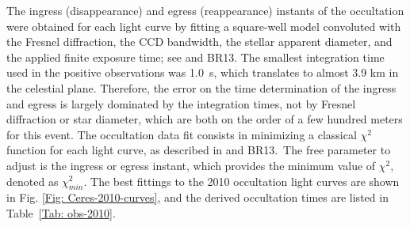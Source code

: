\documentclass[useAMS,usenatbib]{mn2e}
\begin{document}
The ingress (disappearance) and egress (reappearance) instants of the occultation were obtained for each light curve by fitting a square-well model convoluted with the Fresnel diffraction, the CCD bandwidth, the stellar apparent diameter, and the applied finite exposure time; see \cite{Widemann2009} and BR13. %
The smallest integration time used in the positive observations was 1.0~s, which translates to almost 3.9 km in the celestial plane. Therefore, the error on the time determination of the ingress and egress is largely dominated by the integration times, not by Fresnel diffraction or star diameter, which are both on the order of a few hundred meters for this event.
The occultation data fit consists in minimizing a classical $\chi^{2}$ function for each light curve, as described in \cite{Sicardy2011} and BR13.\ The free parameter to adjust is the ingress or egress instant, which provides the minimum value of $\chi^{2}$, denoted as $\chi^{2}_{min}$. The best fittings to the 2010 occultation light curves are shown in Fig. \ref{Fig: Ceres-2010-curves}, and the derived occultation times are listed in Table~\ref{Tab: obs-2010}.
\end{document}
